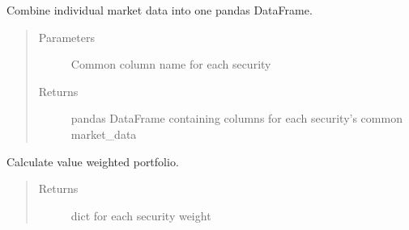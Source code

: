 \documentclass[letterpaper,10pt,english]{sphinxmanual}
\begin{document}
\begin{fulllineitems}
\begin{fulllineitems}
\end{fulllineitems}


\begin{fulllineitems}
\label{\detokenize{securities:risk_dash.securities.Portfolio.set_portfolio_marketdata}}
\sphinxAtStartPar
Combine individual market data into one pandas DataFrame.
\begin{quote}\begin{description}
\item[{Parameters}] \leavevmode
\sphinxAtStartPar
{} \textendash{} Common column name for each security

\item[{Returns}] \leavevmode
\sphinxAtStartPar
pandas DataFrame containing columns for each security’s common market\_data

\end{description}\end{quote}

\end{fulllineitems}


\begin{fulllineitems}
\label{\detokenize{securities:risk_dash.securities.Portfolio.set_weights}}
\sphinxAtStartPar
Calculate value weighted portfolio.
\begin{quote}\begin{description}
\item[{Returns}] \leavevmode
\sphinxAtStartPar
dict for each security weight

\end{description}\end{quote}

\end{fulllineitems}



\end{fulllineitems}
\end{document}
